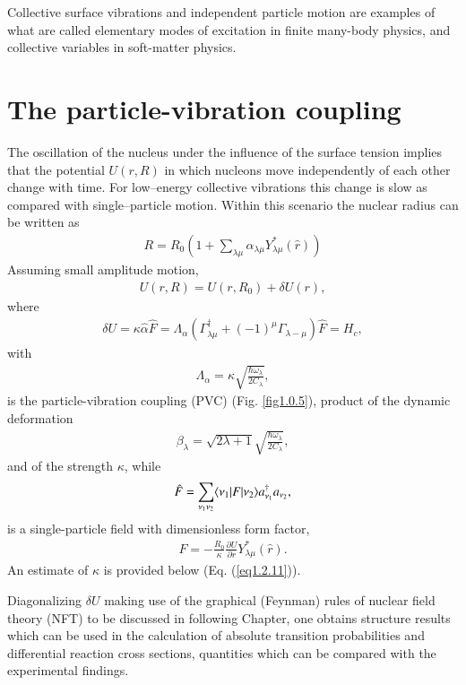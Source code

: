 Collective surface vibrations and independent particle motion are examples of what are called elementary modes of excitation in finite many-body physics, and collective variables in soft-matter physics.

\section{The particle-vibration coupling}\label{Sect1.2}
The oscillation of the nucleus under the influence of the surface tension implies that the potential $U(r,R)$ in which nucleons move independently of each other change with time. For low--energy collective vibrations this change is slow as compared with single--particle motion. Within this scenario the nuclear radius can be written as  
\begin{align}\label{eq1.0.12}
R=R_0\left(1+\sum_{\lambda\mu}\alpha_{\lambda\mu}Y_{\lambda\mu}^*(\hat r)\right)
\end{align}
Assuming small amplitude motion,
\begin{align}\label{eq1.0.13}
U(r,R)=U(r,R_0)+\delta U(r),
\end{align}
where
\begin{align}\label{eq1.0.14}
\delta U=\kappa\hat \alpha \hat F=\Lambda_\alpha\left(\Gamma_{\lambda\mu}^\dagger+(-1)^\mu\Gamma_{\lambda-\mu}\right)\hat F=H_c,
\end{align}
with
\begin{align}\label{eq1.2.4x}
\Lambda_\alpha=\kappa\sqrt{\frac{\hbar\omega_\lambda}{2C_\lambda}},
\end{align}
is the particle-vibration coupling (PVC) (Fig. \ref{fig1.0.5}), product of the dynamic deformation
\begin{align}\label{eq1.2.5x}
\beta_\lambda=\sqrt{2\lambda+1}\sqrt{\frac{\hbar\omega_\lambda}{2C_\lambda}},
\end{align}
and of the strength $\kappa$, while 
\begin{align}\label{eq1.0.15}
\hat F=\sum_{\nu_1\nu_2}\langle {\nu_1}|F|{\nu_2} \rangle a_{\nu_1}^\dagger a_{\nu_2},
\end{align}
is a single-particle field with  dimensionless form factor,
\begin{align}\label{eq1.0.16}
F=-\frac{R_0}{\kappa}\frac{\partial U}{\partial r}Y^*_{\lambda\mu}(\hat r).
\end{align}
An estimate of $\kappa$ is provided below (Eq. (\ref{eq1.2.11})).


 Diagonalizing $\delta U$ making use of the graphical (Feynman) rules of nuclear field theory (NFT) to be discussed in following Chapter, one obtains structure results which can be used in the calculation of absolute transition probabilities and differential reaction cross sections, quantities which can be compared with the experimental findings.


